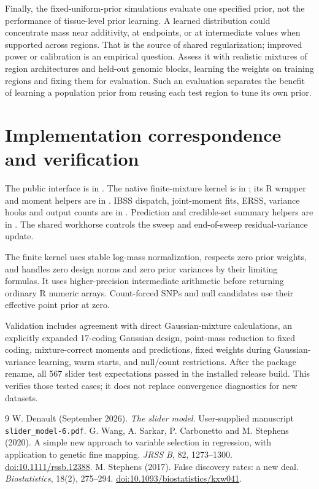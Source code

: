 \documentclass[11pt]{article}
\begin{document}
Finally, the fixed-uniform-prior simulations evaluate one specified prior,
not the performance of tissue-level prior learning. A learned distribution
could concentrate mass near additivity, at endpoints, or at intermediate
values when supported across regions. That is the source of shared
regularization; improved power or calibration is an empirical question.
Assess it with realistic mixtures of region architectures and held-out
genomic blocks, learning the weights on training regions and fixing them
for evaluation. Such an evaluation separates the benefit of learning a
population prior from reusing each test region to tune its own prior.


\section{Implementation correspondence and verification}
The public interface is in . The native finite-mixture
kernel is in ; its R wrapper and moment helpers
are in . IBSS dispatch, joint-moment fits, ERSS,
variance hooks and output counts are in .
Prediction and credible-set summary helpers are in
. The shared workhorse controls the sweep and
end-of-sweep residual-variance update.

The finite kernel uses stable log-mass normalization, respects zero
prior weights, and handles zero design norms and zero prior variances
by their limiting formulas. It uses higher-precision intermediate
arithmetic before returning ordinary R numeric arrays. Count-forced
SNPs and null candidates use their effective point prior at zero.

Validation includes agreement with direct Gaussian-mixture calculations,
an explicitly expanded 17-coding Gaussian design, point-mass reduction
to fixed coding, mixture-correct moments and predictions, fixed weights
during Gaussian-variance learning, warm starts, and null/count restrictions.
After the package rename, all 567 slider test expectations passed in the
installed release build. This verifies those tested cases; it does not
replace convergence diagnostics for new datasets.

\begin{thebibliography}{9}
 W. Denault (September 2026).
\emph{The slider model}. User-supplied manuscript
\texttt{slider\_model-6.pdf}.
 G. Wang, A. Sarkar, P. Carbonetto and M. Stephens (2020).
A simple new approach to variable selection in regression, with
application to genetic fine mapping. \emph{JRSS B}, 82, 1273--1300.
\href{https://doi.org/10.1111/rssb.12388}{doi:10.1111/rssb.12388}.
 M. Stephens (2017).
False discovery rates: a new deal. \emph{Biostatistics}, 18(2), 275--294.
\href{https://doi.org/10.1093/biostatistics/kxw041}{doi:10.1093/biostatistics/kxw041}.
\end{thebibliography}
\end{document}
